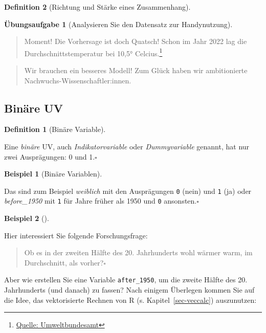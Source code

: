 \documentclass[
  a4paper,
  DIV=11]{scrreprt}
\theoremstyle{definition}
\newtheorem{exercise}{Übungsaufgabe}[chapter]
\theoremstyle{definition}
\newtheorem{example}{Beispiel}[chapter]
\theoremstyle{definition}
\newtheorem{definition}{Definition}[chapter]
\theoremstyle{remark}
\begin{document}
\begin{definition}[Richtung und Stärke eines
Zusammenhang]
\begin{exercise}[Analysieren Sie den Datensatz zur
Handynutzung]
\begin{quote}
{} Moment! Die Vorhersage ist doch Quatsch! Schon im Jahr
2022 lag die Durchschnittstemperatur bei 10,5° Celcius.\footnote{\href{https://www.umweltbundesamt.de/daten/klima/trends-der-lufttemperatur\#steigende-durchschnittstemperaturen-weltweit}{Quelle:
  Umweltbundesamt}}
\end{quote}

\begin{quote}
{} Wir brauchen ein besseres Modell! Zum Glück haben wir
ambitionierte Nachwuchs-Wissenschaftler:innen.
\end{quote}

\subsection{Binäre UV}\label{binuxe4re-uv}

\begin{definition}[Binäre
Variable]\protect\hypertarget{def-binvar}{}\label{def-binvar}

Eine \emph{binäre} UV, auch \emph{Indikatorvariable} oder
\emph{Dummyvariable} genannt, hat nur zwei Ausprägungen: 0 und
1.\(\square\)

\end{definition}

\begin{example}[Binäre
Variablen]\protect\hypertarget{exm-bin}{}\label{exm-bin}

Das sind zum Beispiel \emph{weiblich} mit den Ausprägungen \texttt{0}
(nein) und \texttt{1} (ja) oder \emph{before\_1950} mit \texttt{1} für
Jahre früher als 1950 und \texttt{0} ansonsten.\(\square\)

\end{example}

\begin{example}[]\protect\hypertarget{exm-binuv}{}\label{exm-binuv}

Hier interessiert Sie folgende Forschungsfrage:

\begin{quote}
{} Ob es in der zweiten Hälfte des 20. Jahrhunderts wohl
wärmer warm, im Durchschnitt, als vorher?\(\square\)
\end{quote}

\end{example}

Aber wie erstellen Sie eine Variable \texttt{after\_1950}, um die zweite
Hälfte des 20. Jahrhunderts (und danach) zu fassen? Nach einigem
Überlegen kommen Sie auf die Idee, das vektorisierte Rechnen von R (s.
Kapitel~\ref{sec-veccalc}) auszunutzen:


\end{exercise}
\end{definition}
\end{document}
